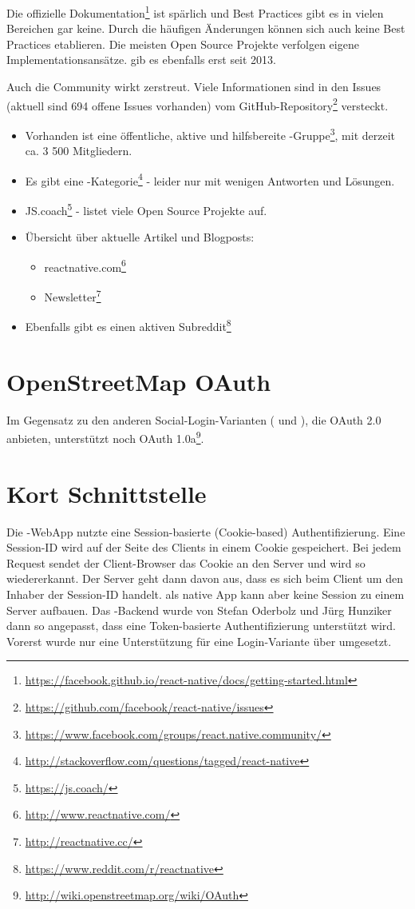 Die offizielle Dokumentation\footnote{\url{https://facebook.github.io/react-native/docs/getting-started.html}} ist spärlich und Best Practices gibt es in vielen Bereichen gar keine.
Durch die häufigen Änderungen können sich auch keine Best Practices etablieren.
 Die meisten Open Source Projekte verfolgen eigene Implementationsansätze.
 gib es ebenfalls erst seit 2013.

Auch die Community wirkt zerstreut. 
Viele Informationen sind in den Issues (aktuell sind 694 offene Issues vorhanden) vom  GitHub-Repository\footnote{\url{https://github.com/facebook/react-native/issues}}  versteckt.


\begin{itemize}
	\item Vorhanden ist eine öffentliche, aktive und hilfsbereite -Gruppe\footnote{\url{https://www.facebook.com/groups/react.native.community/}}, mit derzeit ca. 3 500 Mitgliedern.
	\item Es gibt eine -Kategorie\footnote{\url{http://stackoverflow.com/questions/tagged/react-native}} - leider nur mit wenigen Antworten und Lösungen.
	\item JS.coach\footnote{\url{https://js.coach/}} - listet viele Open Source Projekte auf.
	\item Übersicht über aktuelle Artikel und Blogposts: 
	\begin{itemize}
		\item reactnative.com\footnote{\url{http://www.reactnative.com/}}
		\item {} Newsletter\footnote{\url{http://reactnative.cc/}}
	\end{itemize}
	\item Ebenfalls gibt es einen aktiven Subreddit\footnote{\url{https://www.reddit.com/r/reactnative}}
\end{itemize}


\section{OpenStreetMap OAuth}
Im Gegensatz zu den anderen Social-Login-Varianten ( und ), die OAuth 2.0 anbieten, unterstützt  noch OAuth 1.0a\footnote{\url{http://wiki.openstreetmap.org/wiki/OAuth}}.


\section{Kort Schnittstelle}
Die \kort{}-\gls{WebApp} nutzte eine Session-basierte (Cookie-based) Authentifizierung. 
Eine Session-ID wird auf der Seite des Clients in einem Cookie gespeichert. 
Bei jedem Request sendet der Client-Browser das Cookie an den Server und wird so wiedererkannt. 
Der Server geht dann davon aus, dass es sich beim Client um den Inhaber der Session-ID handelt. 
\kort{} als native App kann aber keine Session zu einem Server aufbauen.
Das \kort{}-Backend wurde von Stefan Oderbolz und Jürg Hunziker dann so angepasst, dass eine Token-basierte Authentifizierung unterstützt wird.
Vorerst wurde nur eine Unterstützung für eine Login-Variante über  umgesetzt.


